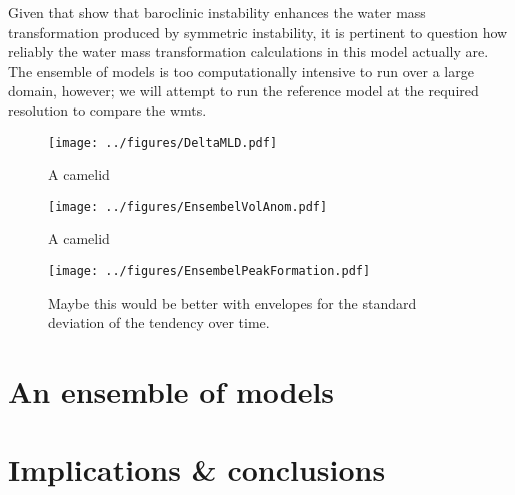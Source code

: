 Given that \citet{Spall2016} show that baroclinic instability enhances the water mass transformation produced by symmetric instability, it is pertinent to question how reliably the water mass transformation calculations in this model actually are. The ensemble of models is too computationally intensive to run over a large domain, however; we will attempt to run the reference model at the required resolution to compare the wmts. 

\begin{figure} 
    \centering
    \texttt{[image: ../figures/DeltaMLD.pdf]}
    \caption{A camelid}
    \label{fig:DeltaMLD}
\end{figure}



\begin{figure} 
    \centering
    \texttt{[image: ../figures/EnsembelVolAnom.pdf]}
    \caption{A camelid}
    \label{fig:EnsVolAnom}
\end{figure}

\begin{figure} 
    \centering
    \texttt{[image: ../figures/EnsembelPeakFormation.pdf]}
    \caption{Maybe this would be better with envelopes for the standard deviation of the tendency over time.}
    \label{fig:EnsPkFormation}
\end{figure}

\section{An ensemble of models}
\label{sec:IrmEns}

\section{Implications \& conclusions}
\label{sec:IrmConc}